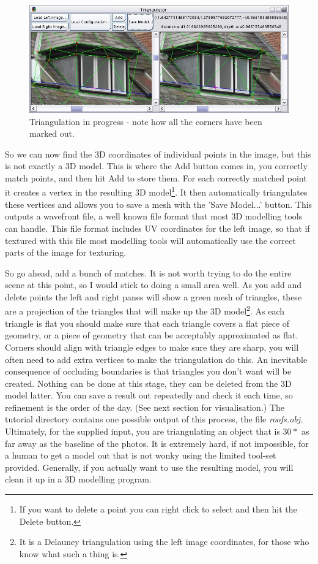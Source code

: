 \documentclass[10pt,a4paper,twoside]{article}
\begin{document}
\begin{figure}
 \centering
 \includegraphics[width=1.0\textwidth]{screenshots/triangulator}
 \caption{Triangulation in progress - note how all the corners have been marked out.}
 \label{fig:triangulator}
\end{figure}

So we can now find the 3D coordinates of individual points in the image, but this is not exactly a 3D model. This is where the Add button comes in, you correctly match points, and then hit Add to store them. For each correctly matched point it creates a vertex in the resulting 3D model\footnote{If you want to delete a point you can right click to select and then hit the Delete button.}. It then automatically triangulates these vertices and allows you to save a mesh with the 'Save Model...' button. This outputs a wavefront file, a well known file format that most 3D modelling tools can handle. This file format includes UV coordinates for the left image, so that if textured with this file most modelling tools will automatically use the correct parts of the image for texturing. 

So go ahead, add a bunch of matches. It is not worth trying to do the entire scene at this point, so I would stick to doing a small area well. As you add and delete points the left and right panes will show a green mesh of triangles, these are a projection of the triangles that will make up the 3D model\footnote{It is a Delauney triangulation using the left image coordinates, for those who know what such a thing is.}. As each triangle is flat you should make sure that each triangle covers a flat piece of geometry, or a piece of geometry that can be acceptably approximated as flat. Corners should align with triangle edges to make sure they are sharp, you will often need to add extra vertices to make the triangulation do this. An inevitable consequence of occluding boundaries is that triangles you don't want will be created. Nothing can be done at this stage, they can be deleted from the 3D model latter. You can save a result out repeatedly and check it each time, so refinement is the order of the day. (See next section for visualisation.) The tutorial directory contains one possible output of this process, the file \emph{roofs.obj}. Ultimately, for the supplied input, you are triangulating an object that is $30*$ as far away as the baseline of the photos. It is extremely hard, if not impossible, for a human to get a model out that is not wonky using the limited tool-set provided. Generally, if you actually want to use the resulting model, you will clean it up in a 3D modelling program.
\end{document}
